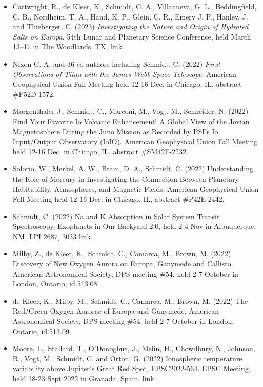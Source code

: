 \documentclass[12pt]{report}
\begin{document}
\begin{itemize}
   \item Cartwright, R., de Kleer, K., Schmidt, C. A., Villanueva, G. L., Beddingfield, C. B., Nordheim, T. A., Hand, K. P., Glein, C. R., Emery J. P., Hanley, J. and Thieberger, C. (2023) \textit{Investigating the Nature and Origin of Hydrated Salts on Europa}. 54th Lunar and Planetary Science Conference, held March 13–17 in The Woodlands, TX, \href{https://www.hou.usra.edu/meetings/lpsc2023/pdf/2215.pdf/}{link.}
   \item Nixon C. A. and 36 co-authors including Schmidt, C. (2022) \textit{First Observations of Titan with the James Webb Space Telescope}.  American Geophysical Union Fall Meeting held 12-16 Dec. in Chicago, IL, abstract \#P52D-1572.
   \item Morgenthaler J., Schmidt, C., Marconi, M., Vogt, M., Schneider, N. (2022) Find Your Favorite Io Volcanic Enhancement! A Global View of the Jovian Magnetosphere During the Juno Mission as Recorded by PSI's Io Input/Output Observatory (IoIO). American Geophysical Union Fall Meeting held 12-16 Dec. in Chicago, IL, abstract \#SM42F-2232.
   \item Solorio, W., Merkel, A. W., Brain, D. A., Schmidt, C. (2022) Understanding the Role of Mercury in Investigating the Connection Between Planetary Habitability, Atmospheres, and Magnetic Fields. American Geophysical Union Fall Meeting held 12-16 Dec. in Chicago, IL, abstract \#P42E-2442.
   \item Schmidt, C. (2022) Na and K Absorption in Solar System Transit Spectroscopy, Exoplanets in Our Backyard 2.0, held 2-4 Nov in Albuquerque, NM, LPI 2687, 3033 \href{https://www.hou.usra.edu/meetings/exoplanets2022/pdf/3033.pdf}{link.} 
   \item Milby, Z., de Kleer, K., Schmidt, C., Camarca, M., Brown, M. (2022) Discovery of New Oxygen Aurora on Europa, Ganymede and Callisto. American Astronomical Society, DPS meeting \#54, held 2-7 October in London, Ontario, id.513.08
   \item de Kleer, K., Milby, M., Schmidt, C., Camarca, M., Brown, M. (2022) The Red/Green Oxygen Aurorae of Europa and Ganymede. American Astronomical Society, DPS meeting \#54, held 2-7 October in London, Ontario, id.513.09
   \item Moore, L., Stallard, T., O'Donoghue, J., Melin, H., Chowdhury, N., Johnson, R., Vogt, M.,  Schmidt, C. and Orton, G. (2022) Ionospheric temperature variability above Jupiter's Great Red Spot, EPSC2022-564. EPSC Meeting, held 18-23 Sept 2022 in Granada, Spain, \href{https://meetingorganizer.copernicus.org/epsc2022/sessionprogramme}{link.}

\end{itemize}
\end{document}
